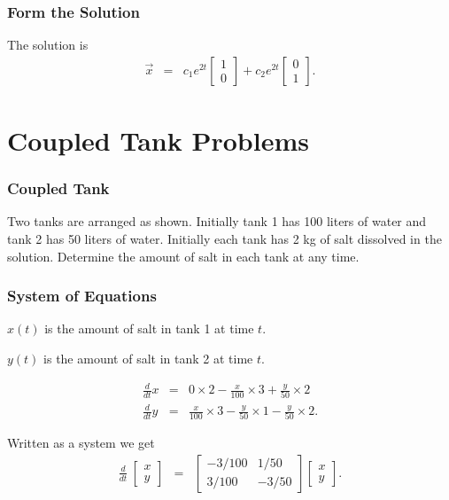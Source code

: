 \documentclass{beamer}
\newcommand{\deriv}[2]{\frac{d}{d#2}#1}
\newcommand{\arrayTwo}[4]{
  \left[
  \begin{array}{rr}
    #1 & #2 \\
    #3 & #4
  \end{array}
  \right]
}
\newcommand{\vecTwo}[2]{
  \left[
  \begin{array}{r}
    #1 \\  #2
  \end{array}
  \right]
}
\begin{document}
\begin{frame}
  \frametitle{Form the Solution}
    
  The solution is 
  \begin{eqnarray*}
    \vec{x} & = & c_1 e^{2t} \vecTwo{1}{0} + c_2 e^{2t} \vecTwo{0}{1}.
  \end{eqnarray*}

\end{frame}


\section{Coupled Tank Problems}


\begin{frame}
  \frametitle{Coupled Tank}

  Two tanks are arranged as shown. Initially tank 1 has 100 liters of
  water and tank 2 has 50 liters of water. Initially each tank has 2
  kg of salt dissolved in the solution. Determine the amount of salt
  in each tank at any time.
  
\end{frame}


\begin{frame}
  \frametitle{System of Equations}

  $x(t)$ is the amount of salt in tank 1 at time $t$.

  $y(t)$ is the amount of salt in tank 2 at time $t$.

  \begin{eqnarray*}
    \deriv{x}{t} & = & 0\times 2 - 
    \frac{x}{100}\times 3 + \frac{y}{50}\times 2 \\
    \deriv{y}{t} & = & \frac{x}{100} \times 3 -
    \frac{y}{50} \times 1 - \frac{y}{50}\times 2.
  \end{eqnarray*}

  Written as a system we get
  \begin{eqnarray*}
    \deriv{~}{t} \vecTwo{x}{y} & = & 
    \arrayTwo{-3/100}{1/50}{3/100}{-3/50} \vecTwo{x}{y}.
  \end{eqnarray*}
  
\end{frame}
\end{document}
